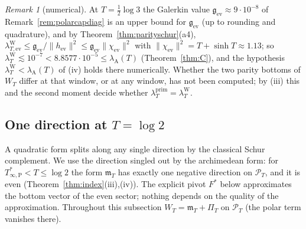 \documentclass[11pt]{amsart}
\theoremstyle{definition}
\theoremstyle{remark}
\newtheorem{remark}[theorem]{Remark}
\newcommand{\PT}{\mathcal P_T}
\newcommand{\lamP}{\lambda^{\mathrm{prim}}_T}
\newcommand{\lamW}{\lambda^{\mathrm W}_T}
\newcommand{\lamA}{\lambda_{\mathrm A}(T)}
\newcommand{\PiT}{\Pi_T}
\newcommand{\mT}{\mathfrak m_T}
\begin{document}
\begin{remark}[numerical]\label{rem:multnum}
At $T=\frac12\log3$ the Galerkin value $\mathfrak g_{\mathrm{ev}}\approx9\cdot10^{-8}$ of Remark~\ref{rem:polarcapdiag}
is an upper bound for $\mathfrak g_{\mathrm{ev}}$ (up to rounding and quadrature), and by
Theorem~\ref{thm:parityschur}(a4), $\lambda^{\mathrm W}_{T,\mathrm{ev}}\le\mathfrak g_{\mathrm{ev}}/\|h_{\mathrm{ev}}\|^2\le\mathfrak g_{\mathrm{ev}}\|\chi_{\mathrm{ev}}\|^2$
with $\|\chi_{\mathrm{ev}}\|^2=T+\sinh T\approx1.13$; so $\lamW\lesssim10^{-7}<8.8577\cdot10^{-5}\le\lamA$
(Theorem~\ref{thm:C}), and the hypothesis $\lamW<\lamA$ of (iv) holds there numerically. Whether the two parity
bottoms of $W_T$ differ at that window, or at any window, has not been computed; by (iii) this and the second
moment decide whether $\lamP=\lamW$.
\end{remark}

\subsection{One direction at \texorpdfstring{$T=\log2$}{T = log 2}}\label{subsec:schur}

A quadratic form splits along any single direction by the classical Schur complement. We use the
direction singled out by the archimedean form: for $T^*_{\infty,\mathrm P}<T\le\log2$ the form $\mT$ has exactly one
negative direction on $\PT$, and it is even (Theorem~\ref{thm:index}(iii),(iv)). The explicit pivot $F^*$ below
approximates the bottom vector of the even sector; nothing depends on the quality of the approximation.
Throughout this subsection $W_T=\mT+\PiT$ on $\PT$ (the polar term vanishes there).
\end{document}
